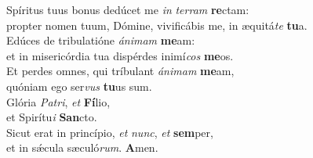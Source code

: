 \evenverse Spíritus tuus bonus dedúcet me \textit{in} \textit{ter}\textit{ram} \textbf{re}ctam:~\*\\
\evenverse propter nomen tuum, Dómine, vivificábis me, in æquitá\textit{te} \textbf{tu}a.\\
\oddverse Edúces de tribulatióne \textit{á}\textit{ni}\textit{mam} \textbf{me}am:~\*\\
\oddverse et in misericórdia tua dispérdes inimí\textit{cos} \textbf{me}os.\\
\evenverse Et perdes omnes, qui tríbulant \textit{á}\textit{ni}\textit{mam} \textbf{me}am,~\*\\
\evenverse quóniam ego ser\textit{vus} \textbf{tu}us sum.\\
\oddverse Glória \textit{Pa}\textit{tri}, \textit{et} \textbf{Fí}lio,~\*\\
\oddverse et Spirítu\textit{i} \textbf{San}cto.\\
\evenverse Sicut erat in princípio, \textit{et} \textit{nunc}, \textit{et} \textbf{sem}per,~\*\\
\evenverse et in sǽcula sæculó\textit{rum}. \textbf{A}men.\\
